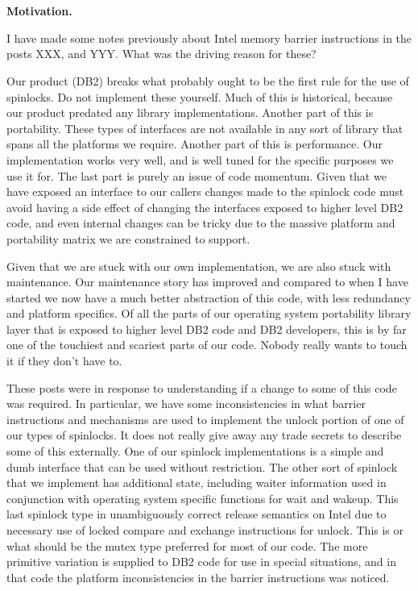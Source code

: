 \section*{}
{\small{\textbf{Motivation.}

I have made some notes previously about Intel memory barrier instructions in the posts XXX, and YYY.  What was the driving reason for these?

Our product (DB2) breaks what probably ought to be the first rule for the use of spinlocks.  Do not implement these yourself.  Much of this is historical, because our product predated any library implementations.  Another part of this is portability.  These types of interfaces are not available in any sort of library that spans all the platforms we require.  Another part of this is performance.  Our implementation works very well, and is well tuned for the specific purposes we use it for.  The last part is purely an issue of code momentum.  Given that we have exposed an interface to our callers changes made to the spinlock code must avoid having a side effect of changing the interfaces exposed to higher level DB2 code, and even internal changes can be tricky due to the massive platform and portability matrix we are constrained to support.

Given that we are stuck with our own implementation, we are also stuck with maintenance.  Our maintenance story has improved and compared to when I have started we now have a much better abstraction of this code, with less redundancy and platform specifics.  Of all the parts of our operating system portability library layer that is exposed to higher level DB2 code and DB2 developers, this is by far one of the touchiest and scariest parts of our code.  Nobody really wants to touch it if they don't have to.

These posts were in response to understanding if a change to some of this code was required.  In particular, we have some inconsistencies in what barrier instructions and mechanisms are used to implement the unlock portion of one of our types of spinlocks.  It does not really give away any trade secrets to describe some of this externally.  One of our spinlock implementations is a simple and dumb interface that can be used without restriction.  The other sort of spinlock that we implement has additional state, including waiter information used in conjunction with operating system specific functions for wait and wakeup.  This last spinlock type in unambiguously correct release semantics on Intel due to necessary use of locked compare and exchange instructions for unlock.  This is or what should be the mutex type preferred for most of our code.  The more primitive variation is supplied to DB2 code for use in special situations, and in that code the platform inconsistencies in the barrier instructions was noticed.

}}
